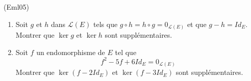 \begin{tiny}(Eml05)\end{tiny}
\begin{enumerate}
  \item Soit $g$ et $h$ dans $\mathcal L (E)$  tels que $g\circ h=h\circ g = 0_{\mathcal{L}(E)}$ et que $g-h=Id_E$. Montrer que $\ker g$ et $\ker h$ sont supplémentaires.
  \item Soit $f$ un endomorphisme de $E$ tel que
\begin{displaymath}
f^{2}-5f+6Id_{E}=0_{\mathcal{L}(E)}  
\end{displaymath}
Montrer que $\ker (f-2Id_{E})$ et $\ker (f-3Id_{E})$ sont supplémentaires.  
\end{enumerate}
